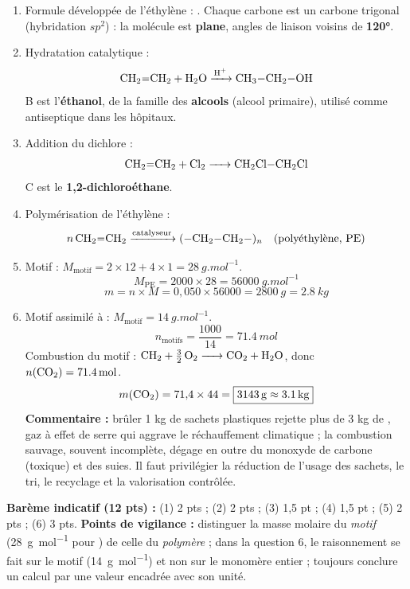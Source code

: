 \documentclass[11pt]{article}
\newcommand{\cle}[1]{{\popxbold\color{popdark}#1}}
\begin{document}
\begin{corrige}
\begin{enumerate}
\item Formule développée de l'éthylène : . Chaque carbone est un \cle{carbone trigonal} (hybridation $sp^2$) : la molécule est \textbf{plane}, angles de liaison voisins de \textbf{\ang{120}}.
\item Hydratation catalytique :
\[ \ce{CH2=CH2 + H2O ->[H+] CH3-CH2-OH} \]
B est l'\textbf{éthanol}, de la famille des \textbf{alcools} (alcool primaire), utilisé comme antiseptique dans les hôpitaux.
\item Addition du dichlore :
\[ \ce{CH2=CH2 + Cl2 -> CH2Cl-CH2Cl} \]
C est le \textbf{1,2-dichloroéthane}.
\item Polymérisation de l'éthylène :
\[ n\,\ce{CH2=CH2} \ce{->[\text{catalyseur}]} \ce{(-CH2-CH2-)_n} \quad \text{(polyéthylène, PE)} \]
\item Motif  : $M_{\text{motif}} = 2 \times 12 + 4 \times 1 = \SI{28}{g.mol^{-1}}$.
\[ M_{\text{PE}} = 2000 \times 28 = \boxed{\SI{56000}{g.mol^{-1}}} \]
\[ m = n \times M = 0{,}050 \times 56000 = \boxed{\SI{2800}{g} = \SI{2,8}{kg}} \]
\item Motif assimilé à  : $M_{\text{motif}} = \SI{14}{g.mol^{-1}}$.
\[ n_{\text{motifs}} = \frac{1000}{14} = \SI{71,4}{mol} \]
Combustion du motif : $\ce{CH2 + \frac{3}{2} O2 -> CO2 + H2O}$, donc $n(\ce{CO2}) = \SI{71,4}{mol}$.
\[ m(\ce{CO2}) = 71{,}4 \times 44 = \boxed{\SI{3143}{g} \approx \SI{3,1}{kg}} \]
\textbf{Commentaire :} brûler 1 kg de sachets plastiques rejette plus de 3 kg de , gaz à effet de serre qui aggrave le réchauffement climatique ; la combustion sauvage, souvent incomplète, dégage en outre du monoxyde de carbone  (toxique) et des suies. Il faut privilégier la réduction de l'usage des sachets, le tri, le recyclage et la valorisation contrôlée.
\end{enumerate}
\textbf{Barème indicatif (12 pts) :} (1) 2 pts ; (2) 2 pts ; (3) 1,5 pt ; (4) 1,5 pt ; (5) 2 pts ; (6) 3 pts. \textbf{Points de vigilance :} distinguer la masse molaire du \emph{motif} (\SI{28}{g.mol^{-1}} pour ) de celle du \emph{polymère} ; dans la question 6, le raisonnement se fait sur le motif  (\SI{14}{g.mol^{-1}}) et non sur le monomère entier ; toujours conclure un calcul par une valeur encadrée avec son unité.
\end{corrige}

\newpage
\end{document}
